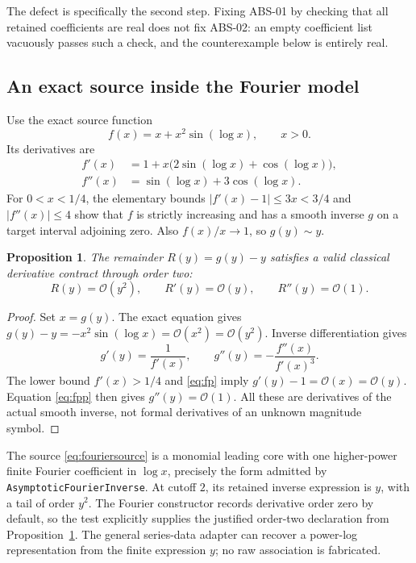 \documentclass[11pt,a4paper]{article}
\newcommand{\code}[1]{\nolinkurl{#1}}
\newcommand{\OO}{\mathcal O}
\newtheorem{proposition}{Proposition}
\begin{document}
The defect is specifically the second step. Fixing ABS-01 by checking that all retained coefficients are real does not fix ABS-02: an empty coefficient list vacuously passes such a check, and the counterexample below is entirely real.

\subsection{An exact source inside the Fourier model}

Use the exact source function
\begin{equation}\label{eq:fouriersource}
 f(x)=x+x^2\sin(\log x),\qquad x>0.
\end{equation}
Its derivatives are
\begin{align}
 f'(x)&=1+x\bigl(2\sin(\log x)+\cos(\log x)\bigr),\label{eq:fp}\\
 f''(x)&=\sin(\log x)+3\cos(\log x).\label{eq:fpp}
\end{align}
For $0<x<1/4$, the elementary bounds $|f'(x)-1|\leq3x<3/4$ and $|f''(x)|\leq4$ show that $f$ is strictly increasing and has a smooth inverse $g$ on a target interval adjoining zero. Also $f(x)/x\to1$, so $g(y)\sim y$.

\begin{proposition}\label{prop:bounds}
The remainder $R(y)=g(y)-y$ satisfies a valid classical derivative contract through order two:
\[
 R(y)=\OO(y^2),\qquad R'(y)=\OO(y),\qquad R''(y)=\OO(1).
\]
\end{proposition}
\begin{proof}
Set $x=g(y)$. The exact equation gives $g(y)-y=-x^2\sin(\log x)=\OO(x^2)=\OO(y^2)$. Inverse differentiation gives
\[
 g'(y)=\frac1{f'(x)},\qquad
 g''(y)=-\frac{f''(x)}{f'(x)^3}.
\]
The lower bound $f'(x)>1/4$ and \eqref{eq:fp} imply $g'(y)-1=\OO(x)=\OO(y)$. Equation \eqref{eq:fpp} then gives $g''(y)=\OO(1)$. All these are derivatives of the actual smooth inverse, not formal derivatives of an unknown magnitude symbol.
\end{proof}

The source \eqref{eq:fouriersource} is a monomial leading core with one higher-power finite Fourier coefficient in $\log x$, precisely the form admitted by \code{AsymptoticFourierInverse}. At cutoff $2$, its retained inverse expression is $y$, with a tail of order $y^2$. The Fourier constructor records derivative order zero by default, so the test explicitly supplies the justified order-two declaration from Proposition~\ref{prop:bounds}. The general series-data adapter can recover a power-log representation from the finite expression $y$; no raw association is fabricated.\cite{fourier,operations}
\end{document}

